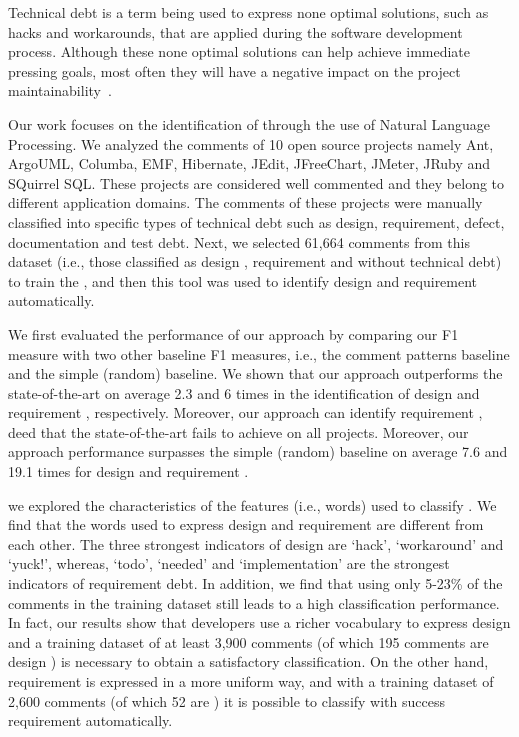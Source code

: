 Technical debt is a term being used to express none optimal solutions, such as hacks and workarounds, that are applied during the software development process. Although these none optimal solutions can help achieve immediate pressing goals, most often they will have a negative impact on the project maintainability~\cite{Zazworka2011MTD}. 

Our work focuses on the identification of \SATD through the use of Natural Language Processing. We analyzed the comments of 10 open source projects namely Ant, ArgoUML, Columba, EMF, Hibernate, JEdit, JFreeChart, JMeter, JRuby and SQuirrel SQL. These projects are considered well commented and they belong to different application domains. The comments of these projects were manually classified into specific types of technical debt such as design, requirement, defect, documentation and test debt. Next, we selected 61,664 comments from this dataset (i.e., those classified as design \SATD, requirement \SATD and without technical debt) to train the , and then this tool was used to identify  design and requirement \SATD automatically.

We first evaluated the performance of our approach by comparing our F1 measure with two other baseline F1 measures, i.e., the comment patterns baseline and the simple (random) baseline. We shown that our approach outperforms the state-of-the-art on average 2.3 and 6 times in the identification of design and requirement \SATD, respectively. Moreover, our approach can identify requirement \SATD, deed that the state-of-the-art fails to achieve on all projects. Moreover, our approach performance surpasses the simple (random) baseline on average 7.6 and 19.1 times for design and requirement \SATD. 

 we explored the characteristics of the features (i.e., words) used to classify \SATD. We find that the words used to express design and requirement \SATD are different from each other. The three strongest indicators of design \SATD are `hack', `workaround' and `yuck!', whereas, `todo', `needed' and `implementation' are the strongest indicators of requirement debt. In addition, we find that using only 5-23\% of the comments in the training dataset still leads to a high classification performance. In fact, our results show that developers use a richer vocabulary to express design \SATD and a training dataset of at least 3,900 comments (of which 195 comments are design \SATD) is necessary to obtain a satisfactory classification. On the other hand, requirement \SATD is expressed in a more uniform way, and with a training dataset of 2,600 comments (of which 52 are \SATD) it is possible to classify with success requirement \SATD automatically.

